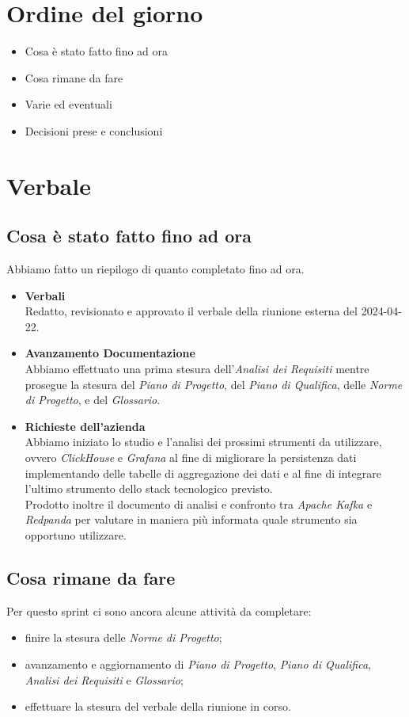 \documentclass[italian,12pt]{article}
\begin{document}
\section{Ordine del giorno}
\begin{itemize}
	\item Cosa è stato fatto fino ad ora
	\item Cosa rimane da fare
	\item Varie ed eventuali
	\item Decisioni prese e conclusioni
\end{itemize}

\newpage

\section{Verbale}

\subsection{Cosa è stato fatto fino ad ora}
Abbiamo fatto un riepilogo di quanto completato fino ad ora.
\begin{itemize}
	\item \textbf{Verbali} \\
	Redatto, revisionato e approvato il verbale della riunione esterna del 2024-04-22.
	\item \textbf{Avanzamento Documentazione} \\
	Abbiamo effettuato una prima stesura dell'\textit{Analisi dei Requisiti} mentre prosegue la stesura del \textit{Piano di Progetto}, del \textit{Piano di Qualifica}, delle \textit{Norme di Progetto}, e del 
	\textit{Glossario}.
	\item \textbf{Richieste dell'azienda} \\
	Abbiamo iniziato lo studio e l'analisi dei prossimi strumenti da utilizzare, ovvero \textit{ClickHouse} e \textit{Grafana} al fine di migliorare la persistenza dati implementando delle tabelle di aggregazione dei dati e al fine di integrare l'ultimo strumento dello stack tecnologico previsto. \\
	Prodotto inoltre il documento di analisi e confronto tra \textit{Apache Kafka} e \textit{Redpanda} per valutare in maniera più informata quale strumento sia opportuno utilizzare.
\end{itemize}

\subsection{Cosa rimane da fare}
Per questo sprint ci sono ancora alcune attività da completare:
\begin{itemize}
	\item finire la stesura delle \textit{Norme di Progetto};
	\item avanzamento e aggiornamento di \textit{Piano di Progetto}, \textit{Piano di Qualifica}, \textit{Analisi dei Requisiti} e \textit{Glossario};
	\item effettuare la stesura del verbale della riunione in corso.
\end{itemize}
\end{document}
